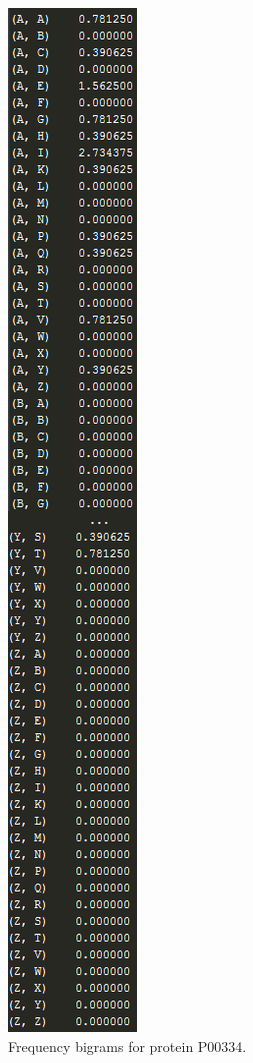 \documentclass[a4paper, 10pt, conference]{ieeeconf}      %
\begin{document}
\begin{figure}[thpb]
	\centering
	\includegraphics[scale=0.6]{1.png}
	\caption{Frequency bigrams for protein P00334.}
	\label{big}
\end{figure}
	
\end{document}
